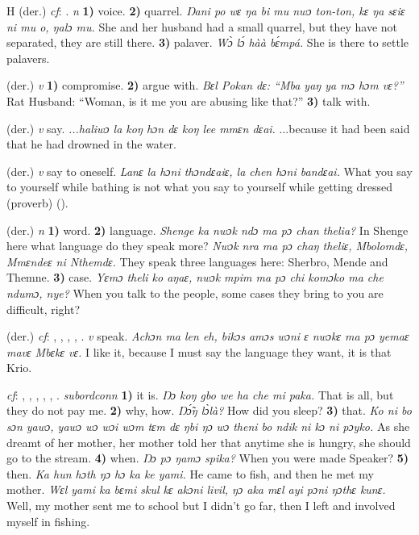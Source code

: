 \begin{letter}{H}
 (der.) \textit{cf}: . \textit{n} \textbf{1)} voice. \textbf{2)} quarrel. \textit{Ŋani po wɛ ŋa bi mu nwɔ ton-ton, kɛ ŋa sɛiɛ ni mu o, ŋalɔ mu.} She and her husband had a small quarrel, but they have not separated, they are still there. \textbf{3)} palaver. \textit{Wɔ̀ lɔ́ hàà bɛ́mpá.} She is there to settle palavers.

 (der.) \textit{v} \textbf{1)} compromise. \textbf{2)} argue with. \textit{Bɛl Pokan dɛ: “Mba yaŋ ya mɔ hɔm vɛ?”} Rat Husband: “Woman, is it me you are abusing like that?” \textbf{3)} talk with.

 (der.) \textit{v} say. \textit{...haliwɔ la koŋ hɔn dɛ koŋ lee mmɛn dɛai.} ...because it had been said that he had drowned in the water. 

 (der.) \textit{v} say to oneself. \textit{Lanɛ la hɔni thɔndɛaiɛ, la chen hɔni bandɛai.} What you say to yourself while bathing is not what you say to yourself while getting dressed (proverb) (\citealt{TISLL1979}). 

 (der.) \textit{n} \textbf{1)} word. \textbf{2)} language. \textit{Shenge ka nwɔk ndɔ ma pɔ chan thelia?} In Shenge here what language do they speak more? \textit{Nwɔk nra ma pɔ chaŋ theliɛ, Mbolomdɛ, Mmɛndeɛ ni Nthemdɛ.} They speak three languages here: Sherbro, Mende and Themne. \textbf{3)} case. \textit{Yɛmɔ theli ko aŋaɛ, nwɔk mpim ma pɔ chi komɔko ma che ndumɔ, nye?} When you talk to the people, some cases they bring to you are difficult, right?

 (der.) \textit{cf}: , , , , . \textit{v} speak. \textit{Achɔn ma len eh, bikɔs amɔs wɔni ɛ nwɔkɛ ma pɔ yemaɛ mavɛ Mbɛkɛ vɛ.} I like it, because I must say the language they want, it is that Krio.

 \textit{cf}: , , , , , . \textit{subordconn} \textbf{1)} it is. \textit{Ŋɔ koŋ gbo we ha che mi paka.} That is all, but they do not pay me. \textbf{2)} why, how. \textit{Ŋɔ̃́ŋ lɔ̀là?} How did you sleep? \textbf{3)} that. \textit{Ko ni bo sɔn yawɔ, yawɔ wɔ wɔi wɔm tɛm dɛ ŋbi ŋɔ wɔ theni bo ndik ni kɔ ni pɔyko.} As she dreamt of her mother, her mother told her that anytime she is hungry, she should go to the stream. \textbf{4)} when. \textit{Ŋɔ pɔ ŋamɔ spika?} When you were made Speaker? \textbf{5)} then. \textit{Ka hun hɔth ŋɔ hɔ ka ke yami.} He came to fish, and then he met my mother. \textit{Wɛl yami ka bɛmi skul kɛ akɔni livil, ŋɔ aka mɛl ayi pɔni ŋɔthɛ kunɛ.} Well, my mother sent me to school but I didn't go far, then I left and involved myself in fishing.


\end{letter}
